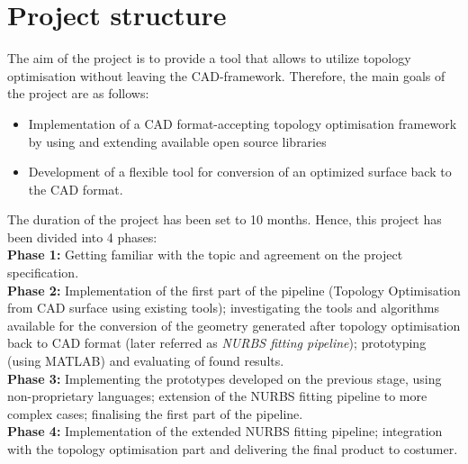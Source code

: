 \section{Project structure}
The aim of the project is to provide a tool that allows to utilize topology optimisation without leaving the CAD-framework. Therefore, the main goals of the project are as follows:
\begin{itemize}
\item Implementation of a CAD format-accepting topology optimisation framework by using and extending available open source libraries
\item Development of a flexible tool for conversion of an optimized surface back to the CAD format.
\end{itemize}

The duration of the project has been set to 10 months. Hence, this project has been divided into 4 phases:\\

\textbf{Phase 1:} Getting familiar with the topic and agreement on the project specification.\\

\textbf{Phase 2:} Implementation of the first part of the pipeline (Topology Optimisation from CAD surface using existing tools); investigating the tools and algorithms available for the conversion of the geometry generated after topology optimisation back to CAD format (later referred as \emph{NURBS fitting pipeline}); prototyping (using MATLAB) and evaluating of found results.\\

\textbf{Phase 3:} Implementing the prototypes developed on the previous stage, using non-proprietary languages; extension of the NURBS fitting pipeline to more complex cases; finalising the first part of the pipeline.\\

\textbf{Phase 4:} Implementation of the extended NURBS fitting pipeline; integration with the topology optimisation part and delivering the final product to costumer.

